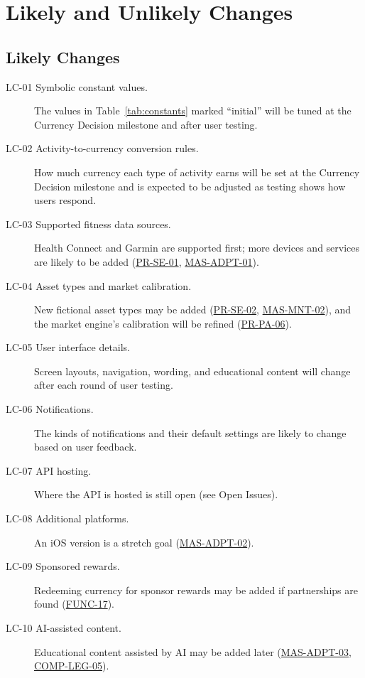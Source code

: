 \documentclass[12pt]{article}
\begin{document}
\section{Likely and Unlikely Changes}
\label{sec:changes}

\subsection{Likely Changes}

\begin{description}
  \item[LC-01 Symbolic constant values.] The values in
  Table~\ref{tab:constants} marked ``initial'' will be tuned at the Currency
  Decision milestone and after user testing.
  \item[LC-02 Activity-to-currency conversion rules.] How much currency each
  type of activity earns will be set at the Currency Decision milestone and is
  expected to be adjusted as testing shows how users respond.
  \item[LC-03 Supported fitness data sources.] Health Connect and Garmin are
  supported first; more devices and services are likely to be added
  (\hyperlink{req:PR-SE-01}{PR-SE-01}, \hyperlink{req:MAS-ADPT-01}{MAS-ADPT-01}).
  \item[LC-04 Asset types and market calibration.] New fictional asset types
  may be added (\hyperlink{req:PR-SE-02}{PR-SE-02}, \hyperlink{req:MAS-MNT-02}{MAS-MNT-02}), and the market engine's calibration will
  be refined (\hyperlink{req:PR-PA-06}{PR-PA-06}).
  \item[LC-05 User interface details.] Screen layouts, navigation, wording, and
  educational content will change after each round of user testing.
  \item[LC-06 Notifications.] The kinds of notifications and their default
  settings are likely to change based on user feedback.
  \item[LC-07 API hosting.] Where the API is hosted is still open (see Open
  Issues).
  \item[LC-08 Additional platforms.] An iOS version is a stretch goal
  (\hyperlink{req:MAS-ADPT-02}{MAS-ADPT-02}).
  \item[LC-09 Sponsored rewards.] Redeeming currency for sponsor rewards may be
  added if partnerships are found (\hyperlink{req:FUNC-17}{FUNC-17}).
  \item[LC-10 AI-assisted content.] Educational content assisted by AI may be
  added later (\hyperlink{req:MAS-ADPT-03}{MAS-ADPT-03}, \hyperlink{req:COMP-LEG-05}{COMP-LEG-05}).
\end{description}
\end{document}
